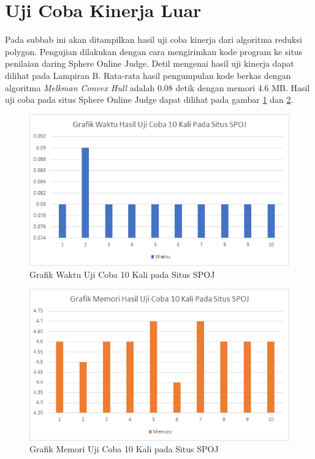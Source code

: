 \section{ Uji Coba Kinerja Luar}
Pada subbab ini akan ditampilkan hasil uji coba kinerja dari algoritma reduksi polygon. Pengujian dilakukan dengan cara mengirimkan kode program ke situs penilaian daring Sphere Online Judge. Detil mengenai hasil uji kinerja dapat dilihat pada Lampiran B. Rata-rata hasil pengumpulan kode berkas dengan algoritma \textit{Melkman Convex Hull} adalah 0.08 detik dengan memori 4.6 MB. Hasil uji coba pada situs Sphere Online Judge dapat dilihat pada gambar \ref{fig:grafik-waktu-uji-coba-spoj} dan \ref{fig:grafik-memori-uji-coba-spoj}.
\begin{figure}[!h]
	\Centering
	\includegraphics [width=\columnwidth]{bab5/img/grafik-waktu-uji-coba-spoj}
	\caption {Grafik Waktu Uji Coba 10 Kali pada Situs SPOJ}
	\label {fig:grafik-waktu-uji-coba-spoj}
\end{figure}
\begin{figure}[!h]
	\Centering
	\includegraphics [width=\columnwidth]{bab5/img/grafik-memori-uji-coba-spoj}
	\caption {Grafik Memori Uji Coba 10 Kali pada Situs SPOJ}
	\label {fig:grafik-memori-uji-coba-spoj}
\end{figure}

